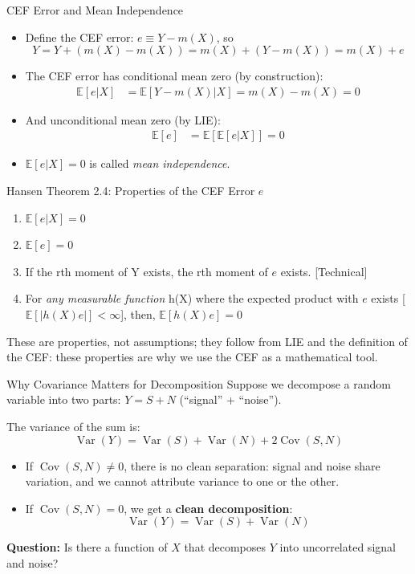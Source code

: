 \documentclass[aspectratio=169, handout, t]{beamer}
\numberwithin{equation}{section}
\begin{document}
\begin{frame}{CEF Error and Mean Independence}
\begin{itemize}
\item Define the CEF error: $e\equiv Y-m(X)$, so 
$$Y=Y+(m(X)-m(X))=m(X)+(Y-m(X))=m(X)+e$$
\item The CEF error has conditional mean zero (by construction):
\begin{align*}
\mathbb{E}[e|X]&=\mathbb{E}[Y-m(X)|X]=m(X)-m(X)=0
\end{align*}
\item And unconditional mean zero (by LIE):
\begin{align*}
\mathbb{E}[e]&=\mathbb{E}[\mathbb{E}[e|X]]=0
\end{align*}
\item $\mathbb{E}[e|X]=0$ is called \emph{mean independence}.
\end{itemize}
\end{frame}


\begin{frame}{Hansen Theorem 2.4: Properties of the CEF Error $e$}
\begin{enumerate}
\item $\mathbb{E}[e|X]=0$
\item $\mathbb{E}[e]=0$
\item If the rth moment of Y exists, the rth moment of $e$ exists. [Technical]
\item For \emph{any measurable function} h(X) where the expected product with $e$ exists [$\mathbb{E}[|h(X)e|]< \infty$], then, $\mathbb{E}[h(X)e]=0$
\end{enumerate}
\bigskip

\begin{tcolorbox}[colback=blue!5, colframe=blue!50, title=Key Point]
These are properties, not assumptions; they follow from LIE and the definition of the CEF: \alert{these properties are why we use the CEF as a mathematical tool.}
\end{tcolorbox}
\end{frame}



\begin{frame}{Why Covariance Matters for Decomposition}
Suppose we decompose a random variable into two parts: $Y = S + N$ (``signal'' + ``noise'').
\pause
\medskip

The variance of the sum is:
$$\operatorname{Var}(Y)=\operatorname{Var}(S)+\operatorname{Var}(N)+2\operatorname{Cov}(S,N)$$
\pause
\begin{itemize}
\item If $\operatorname{Cov}(S,N)\neq 0$, there is no clean separation: signal and noise share variation, and we cannot attribute variance to one or the other.
\pause
\item If $\operatorname{Cov}(S,N)= 0$, we get a \textbf{clean decomposition}:
$$\operatorname{Var}(Y)=\operatorname{Var}(S)+\operatorname{Var}(N)$$
\end{itemize}
\pause
\medskip
\textbf{Question:} Is there a function of $X$ that decomposes $Y$ into uncorrelated signal and noise?
\end{frame}
\end{document}
